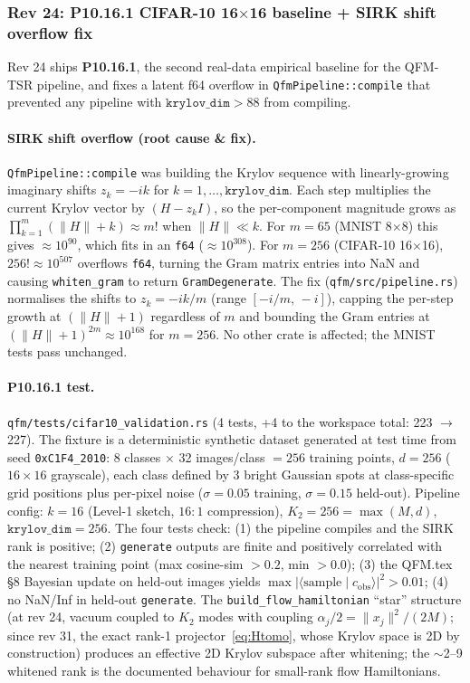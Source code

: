 \documentclass[11pt, a4paper]{article}
\begin{document}
\subsubsection*{Rev 24: P10.16.1 CIFAR-10 16$\times$16 baseline + SIRK shift overflow fix}

Rev 24 ships \textbf{P10.16.1}, the second real-data empirical
baseline for the QFM-TSR pipeline, and fixes a latent f64 overflow
in \texttt{QfmPipeline::compile} that prevented any pipeline with
$\texttt{krylov\_dim} > 88$ from compiling.

\paragraph{SIRK shift overflow (root cause \& fix).}
\texttt{QfmPipeline::compile} was building the Krylov sequence with
linearly-growing imaginary shifts $z_k = -ik$ for
$k = 1, \ldots, \texttt{krylov\_dim}$.  Each step multiplies the
current Krylov vector by $(H - z_k I)$, so the per-component
magnitude grows as
$\prod_{k=1}^{m}(\|H\|+k) \approx m!$ when $\|H\| \ll k$.
For $m = 65$ (MNIST 8$\times$8) this gives $\approx 10^{90}$, which
fits in an \texttt{f64} ($\approx 10^{308}$).  For $m = 256$
(CIFAR-10 16$\times$16), $256!\approx 10^{507}$ overflows
\texttt{f64}, turning the Gram matrix entries into NaN and causing
\texttt{whiten\_gram} to return \texttt{GramDegenerate}.  The fix
(\texttt{qfm/src/pipeline.rs}) normalises the shifts to
$z_k = -ik/m$ (range $[-i/m,\, -i]$), capping the per-step growth
at $(\|H\|+1)$ regardless of $m$ and bounding the Gram entries at
$(\|H\|+1)^{2m} \approx 10^{168}$ for $m=256$.  No other crate is
affected; the MNIST tests pass unchanged.

\paragraph{P10.16.1 test.}
\texttt{qfm/tests/cifar10\_validation.rs} (4 tests, +4 to the
workspace total: 223 $\to$ 227).  The fixture is a deterministic
synthetic dataset generated at test time from seed
\texttt{0xC1F4\_2010}: 8 classes $\times$ 32 images/class $= 256$
training points, $d = 256$ ($16\times 16$ grayscale), each class
defined by 3 bright Gaussian spots at class-specific grid
positions plus per-pixel noise ($\sigma=0.05$ training,
$\sigma=0.15$ held-out).  Pipeline config: $k=16$ (Level-1
sketch, $16{:}1$ compression), $K_2 = 256 = \max(M,d)$,
$\texttt{krylov\_dim} = 256$.  The four tests check: (1) the
pipeline compiles and the SIRK rank is positive; (2)
\texttt{generate} outputs are finite and positively correlated
with the nearest training point (max cosine-sim $>0.2$, min
$>0.0$); (3) the QFM.tex \S8 Bayesian update on held-out images
yields $\max|\langle\text{sample}\mid c_{\text{obs}}\rangle|^2
> 0.01$; (4) no NaN/Inf in held-out \texttt{generate}.  The
\texttt{build\_flow\_hamiltonian} ``star'' structure (at rev 24, vacuum
coupled to $K_2$ modes with coupling $\alpha_j/2 = \|x_j\|^2/(2M)$; since
rev 31, the exact rank-1 projector~\eqref{eq:Htomo}, whose Krylov space is
2D by construction) produces an effective 2D Krylov subspace after
whitening; the $\sim$2--9 whitened rank is the documented behaviour for
small-rank flow Hamiltonians.
\end{document}
